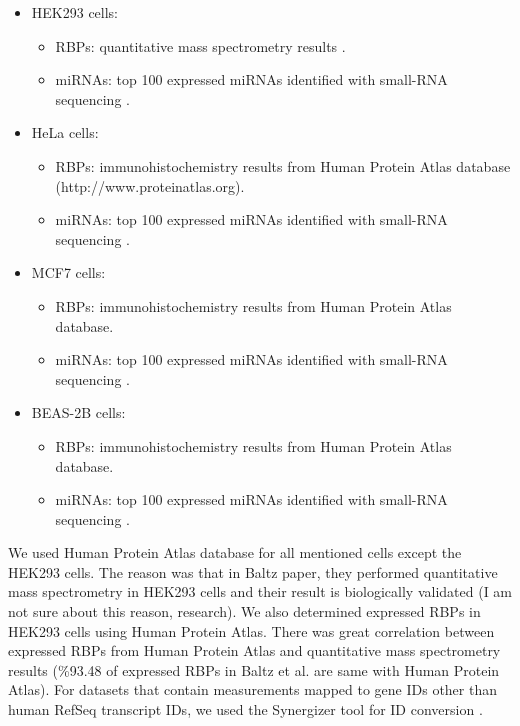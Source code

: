 \begin{itemize}
\item HEK293 cells: 
\begin{itemize}
\item RBPs: quantitative mass spectrometry results \cite{baltz_12}.
\item miRNAs: top 100 expressed miRNAs identified with small-RNA sequencing \cite{hafner_10}.
\end{itemize}
\item HeLa cells:
\begin{itemize}
\item RBPs: immunohistochemistry results from Human Protein Atlas database (http://www.proteinatlas.org).
\item miRNAs: top 100 expressed miRNAs identified with small-RNA sequencing \cite{lebedeva_11}.
\end{itemize}
\item MCF7 cells:
\begin{itemize}
\item RBPs: immunohistochemistry results from Human Protein Atlas database.
\item miRNAs: top 100 expressed miRNAs identified with small-RNA sequencing \cite{anbalagan_14}.
\end{itemize}
\item BEAS-2B cells:
\begin{itemize}
\item RBPs: immunohistochemistry results from Human Protein Atlas database.
\item miRNAs:  top 100 expressed miRNAs identified with small-RNA sequencing \cite{zhao_14}.
\end{itemize}
\end{itemize}

We used Human Protein Atlas database for all mentioned cells except the HEK293 cells. The reason was that in Baltz paper, they performed quantitative mass spectrometry in HEK293 cells and their result is biologically validated (I am not sure about this reason, research). We also determined expressed RBPs in HEK293 cells using Human Protein Atlas. There was great correlation between expressed RBPs from Human Protein Atlas and quantitative mass spectrometry results (\%93.48 of expressed RBPs in Baltz et al. are same with Human Protein Atlas). 
For datasets that contain measurements mapped to gene IDs other than human RefSeq transcript IDs, we used the Synergizer tool for ID conversion \cite{synergizer}.


